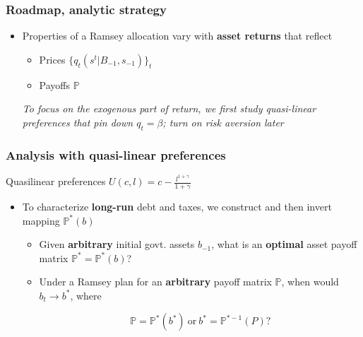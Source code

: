 \documentclass{beamer}
\begin{document}
\begin{frame}
\frametitle{Roadmap, analytic strategy}

	\begin{itemize}
	\item Properties of a Ramsey allocation  vary with   \textbf{asset returns} that reflect
	\begin{itemize}
	 \item Prices $\{q_t(s^t|B_{-1},s_{-1})\}_t$
	 \item Payoffs $\mathbb{P}$
	\end{itemize}
	
\emph{To focus on the exogenous part of return, we first study quasi-linear  preferences  that pin down $q_t=\beta$; turn on  risk aversion later}
	
\end{itemize}
\end{frame}


\begin{frame}
\frametitle{Analysis with quasi-linear preferences}


Quasilinear preferences $U(c,l)=c-\frac{l^{1+\gamma}}{1+\gamma}$

\begin{itemize}
	
\item To characterize \textbf{long-run}  debt and  taxes,  we construct and then invert  mapping $\mathbb{P}^*(b)$

\begin{itemize}
 \item Given \textbf{arbitrary} initial govt. assets $b_{-1}$, what is  an \textbf{optimal} asset payoff matrix $\mathbb{P}^* =\mathbb{P}^*(b)$?

 \item Under a Ramsey plan for an \textbf{arbitrary} payoff matrix $\mathbb{P}$,  when would  $b_t \to b^*$, where

	\[\mathbb{P}=\mathbb{P}^*(b^*) \ \textrm{or} \ b^* = \mathbb{P}^{* -1}(P) ?\]
	
 \end{itemize}
\end{itemize}
\end{frame}
\end{document}
